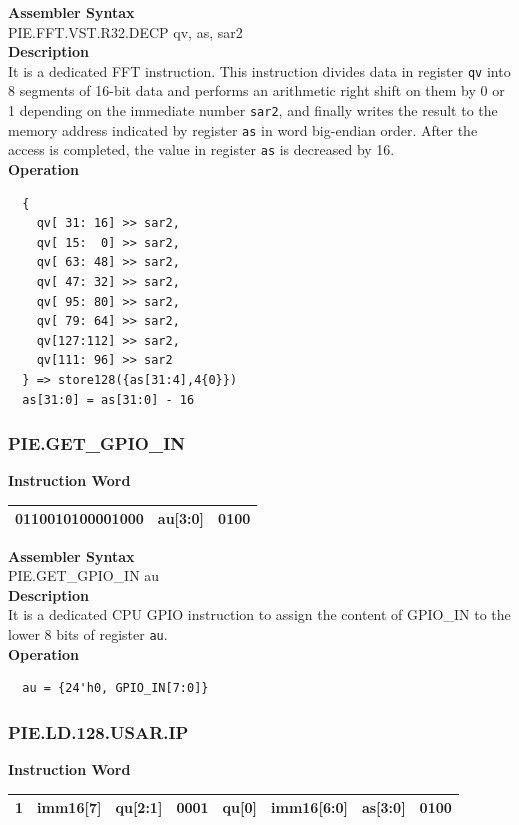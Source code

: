 \textbf{Assembler Syntax} \\
PIE.FFT.VST.R32.DECP qv, as, sar2 \\
\textbf{Description} \\
It is a dedicated FFT instruction. This instruction divides data in register \lstinline {qv} into 8 segments of 16-bit data and performs an arithmetic right shift on them by 0 or 1 depending on the immediate number \lstinline{sar2}, and finally writes the result to the memory address indicated by register \lstinline{as} in word big-endian order. After the access is completed, the value in register \lstinline{as} is decreased by 16.\\
\textbf{Operation}
\begin{lstlisting}
  {
    qv[ 31: 16] >> sar2,
    qv[ 15:  0] >> sar2,
    qv[ 63: 48] >> sar2,
    qv[ 47: 32] >> sar2,
    qv[ 95: 80] >> sar2,
    qv[ 79: 64] >> sar2,
    qv[127:112] >> sar2,
    qv[111: 96] >> sar2
  } => store128({as[31:4],4{0}})
  as[31:0] = as[31:0] - 16
\end{lstlisting}

\newpage
\subsubsection{PIE.GET\_GPIO\_IN}\label{instruction:PIEGETGPIOIN}
\setlength\tabcolsep{6pt}
\textbf{Instruction Word} \\
\begin{tabular}{|c|c|c|}
	\hline
	0110010100001000 & au[3:0] & 0100 \\
	\hline
\end{tabular}

\textbf{Assembler Syntax} \\
PIE.GET\_GPIO\_IN au \\
\textbf{Description} \\
It is a dedicated CPU GPIO instruction to assign the content of GPIO\_IN to the lower 8 bits of register \lstinline{au}.\\
\textbf{Operation}
\begin{lstlisting}
  au = {24'h0, GPIO_IN[7:0]}
\end{lstlisting}

\newpage
\subsubsection{PIE.LD.128.USAR.IP}\label{instruction:PIELD128USARIP}
\setlength\tabcolsep{6pt}
\textbf{Instruction Word} \\
\begin{tabular}{|c|c|c|c|c|c|c|c|}
	\hline
	1 & imm16[7] & qu[2:1] & 0001 & qu[0] & imm16[6:0] & as[3:0] & 0100 \\
	\hline
\end{tabular}

